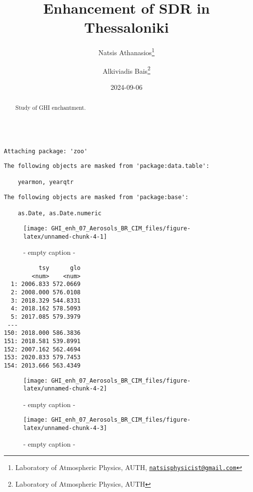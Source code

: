 \documentclass[
  10pt,
  a4paper,oneside]{article}
\title{Enhancement of SDR in Thessaloniki}
\author{Natsis Athanasios\footnote{Laboratory of Atmospheric Physics, AUTH, \href{mailto:natsisphysicist@gmail.com}{\nolinkurl{natsisphysicist@gmail.com}}} \and Alkiviadis Bais\footnote{Laboratory of Atmospheric Physics, AUTH}}
\date{2024-09-06}
\begin{document}
\maketitle
\begin{abstract}
Study of GHI enchantment.
\end{abstract}

{
\hypersetup{linkcolor=}
\setcounter{tocdepth}{4}
\tableofcontents
}
\begin{verbatim}

Attaching package: 'zoo'
\end{verbatim}

\begin{verbatim}
The following objects are masked from 'package:data.table':

    yearmon, yearqtr
\end{verbatim}

\begin{verbatim}
The following objects are masked from 'package:base':

    as.Date, as.Date.numeric
\end{verbatim}

\begin{figure}[H]

{\centering \texttt{[image: GHI\_enh\_07\_Aerosols\_BR\_CIM\_files/figure-latex/unnamed-chunk-4-1]} 

}

\caption{ - empty caption - }\label{fig:unnamed-chunk-4-1}
\end{figure}

\begin{verbatim}
          tsy      glo
        <num>    <num>
  1: 2006.833 572.0669
  2: 2008.000 576.0108
  3: 2018.329 544.8331
  4: 2018.162 578.5093
  5: 2017.085 579.3979
 ---                  
150: 2018.000 586.3836
151: 2018.581 539.8991
152: 2007.162 562.4694
153: 2020.833 579.7453
154: 2013.666 563.4349
\end{verbatim}

\begin{figure}[H]

{\centering \texttt{[image: GHI\_enh\_07\_Aerosols\_BR\_CIM\_files/figure-latex/unnamed-chunk-4-2]} 

}

\caption{ - empty caption - }\label{fig:unnamed-chunk-4-2}
\end{figure}
\begin{figure}[H]

{\centering \texttt{[image: GHI\_enh\_07\_Aerosols\_BR\_CIM\_files/figure-latex/unnamed-chunk-4-3]} 

}

\caption{ - empty caption - }\label{fig:unnamed-chunk-4-3}
\end{figure}
\end{document}
